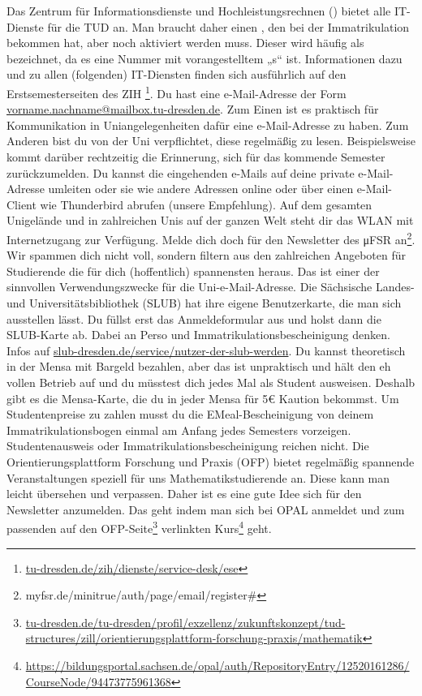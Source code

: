\documentclass{scrartcl}
\begin{document}
\begin{description}
   Das Zentrum für Informationsdienste und Hochleistungsrechnen ()
    bietet alle IT-Dienste für die TUD an. Man braucht daher einen , den bei der
    Immatrikulation bekommen hat, aber noch aktiviert werden muss.
    Dieser wird häufig als  bezeichnet, da es eine Nummer mit vorangestelltem „s“ ist.
    Informationen dazu und zu allen (folgenden) IT-Diensten finden sich ausführlich auf den Erstsemesterseiten des ZIH \footnote{\url{tu-dresden.de/zih/dienste/service-desk/ese}\label{zihurl}}.
     Du hast eine e-Mail-Adresse der Form \url{vorname.nachname@mailbox.tu-dresden.de}.
    Zum Einen ist es praktisch für Kommunikation in Uniangelegenheiten dafür eine e-Mail-Adresse zu haben.
    Zum Anderen bist du von der Uni verpflichtet, diese regelmäßig zu lesen.
    Beispielsweise kommt darüber rechtzeitig die Erinnerung, sich für das kommende Semester zurückzumelden.
    Du kannst die eingehenden e-Mails auf deine private e-Mail-Adresse umleiten oder sie wie andere Adressen
    online oder über einen e-Mail-Client wie Thunderbird abrufen (unsere Empfehlung).
   Auf dem gesamten Unigelände und in zahlreichen Unis auf der ganzen Welt steht dir
    das WLAN  mit Internetzugang zur Verfügung.
     Melde dich doch für den Newsletter des μFSR an\footnote{myfsr.de/minitrue/auth/page/email/register#}.
    Wir spammen dich nicht voll, sondern
    filtern aus den zahlreichen Angeboten für Studierende die für dich (hoffentlich) spannensten heraus.
    Das ist einer der sinnvollen Verwendungszwecke für die Uni-e-Mail-Adresse.
   Die Sächsische Landes- und Universitätsbibliothek (SLUB) hat ihre eigene Benutzerkarte,
    die man sich ausstellen lässt. Du füllst erst das Anmeldeformular aus und holst dann die SLUB-Karte ab. Dabei an Perso und Immatrikulationsbescheinigung denken. Infos auf \url{slub-dresden.de/service/nutzer-der-slub-werden}.
   Du kannst theoretisch in der Mensa mit Bargeld bezahlen,
    aber das ist unpraktisch und hält den eh vollen Betrieb auf und
    du müsstest dich jedes Mal als Student ausweisen.
    Deshalb gibt es die Mensa-Karte,
    die du in jeder Mensa für 5€ Kaution bekommst.
    Um Studentenpreise zu zahlen musst du die EMeal-Bescheinigung von deinem Immatrikulationsbogen
    einmal am Anfang jedes Semesters vorzeigen.
    Studentenausweis oder Immatrikulationsbescheinigung reichen nicht.
   Die Orientierungsplattform Forschung und Praxis (OFP) bietet regelmäßig spannende Veranstaltungen
    speziell für uns Mathematikstudierende an.
    Diese kann man leicht übersehen und verpassen.
    Daher ist es eine gute Idee sich für den Newsletter anzumelden.
    Das geht indem man sich bei OPAL anmeldet und zum passenden auf den
    OFP-Seite\footnote{\url{tu-dresden.de/tu-dresden/profil/exzellenz/zukunftskonzept/tud-structures/zill/orientierungsplattform-forschung-praxis/mathematik}}
    verlinkten Kurs\footnote{\url{https://bildungsportal.sachsen.de/opal/auth/RepositoryEntry/12520161286/CourseNode/94473775961368}} geht.
    

\end{description}
\end{document}
